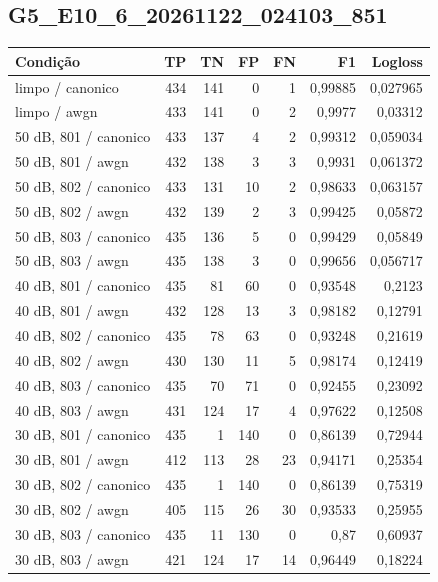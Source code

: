 \subsection{G5\_E10\_6\_20261122\_024103\_851}
\small\begin{longtable}{@{}p{.38\linewidth}rrrrrr@{}}
\toprule Condição & TP & TN & FP & FN & F1 & Logloss\\\midrule\endhead
limpo /\allowbreak{} canonico & 434 & 141 & 0 & 1 & 0,99885 & 0,027965\\
limpo /\allowbreak{} awgn & 433 & 141 & 0 & 2 & 0,9977 & 0,03312\\
50 dB, 801 /\allowbreak{} canonico & 433 & 137 & 4 & 2 & 0,99312 & 0,059034\\
50 dB, 801 /\allowbreak{} awgn & 432 & 138 & 3 & 3 & 0,9931 & 0,061372\\
50 dB, 802 /\allowbreak{} canonico & 433 & 131 & 10 & 2 & 0,98633 & 0,063157\\
50 dB, 802 /\allowbreak{} awgn & 432 & 139 & 2 & 3 & 0,99425 & 0,05872\\
50 dB, 803 /\allowbreak{} canonico & 435 & 136 & 5 & 0 & 0,99429 & 0,05849\\
50 dB, 803 /\allowbreak{} awgn & 435 & 138 & 3 & 0 & 0,99656 & 0,056717\\
40 dB, 801 /\allowbreak{} canonico & 435 & 81 & 60 & 0 & 0,93548 & 0,2123\\
40 dB, 801 /\allowbreak{} awgn & 432 & 128 & 13 & 3 & 0,98182 & 0,12791\\
40 dB, 802 /\allowbreak{} canonico & 435 & 78 & 63 & 0 & 0,93248 & 0,21619\\
40 dB, 802 /\allowbreak{} awgn & 430 & 130 & 11 & 5 & 0,98174 & 0,12419\\
40 dB, 803 /\allowbreak{} canonico & 435 & 70 & 71 & 0 & 0,92455 & 0,23092\\
40 dB, 803 /\allowbreak{} awgn & 431 & 124 & 17 & 4 & 0,97622 & 0,12508\\
30 dB, 801 /\allowbreak{} canonico & 435 & 1 & 140 & 0 & 0,86139 & 0,72944\\
30 dB, 801 /\allowbreak{} awgn & 412 & 113 & 28 & 23 & 0,94171 & 0,25354\\
30 dB, 802 /\allowbreak{} canonico & 435 & 1 & 140 & 0 & 0,86139 & 0,75319\\
30 dB, 802 /\allowbreak{} awgn & 405 & 115 & 26 & 30 & 0,93533 & 0,25955\\
30 dB, 803 /\allowbreak{} canonico & 435 & 11 & 130 & 0 & 0,87 & 0,60937\\
30 dB, 803 /\allowbreak{} awgn & 421 & 124 & 17 & 14 & 0,96449 & 0,18224\\

\end{longtable}
